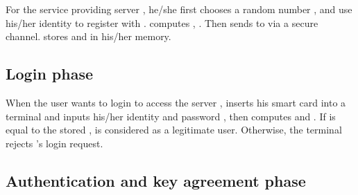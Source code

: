 \documentclass[preprint,12pt]{elsarticle}
\begin{document}
For the service providing server , he/she first chooses a random number , and use his/her identity  to register with .  computes , . Then  sends  to  via a secure channel.  stores  and  in his/her memory.

\subsection{Login phase}
When the user  wants to login to access the server ,  inserts his smart card into a terminal and inputs his/her identity  and password , then computes  and . If  is equal to the stored ,  is considered as a legitimate user. Otherwise, the terminal rejects 's login request.

\subsection{Authentication and key agreement phase}
\end{document}
